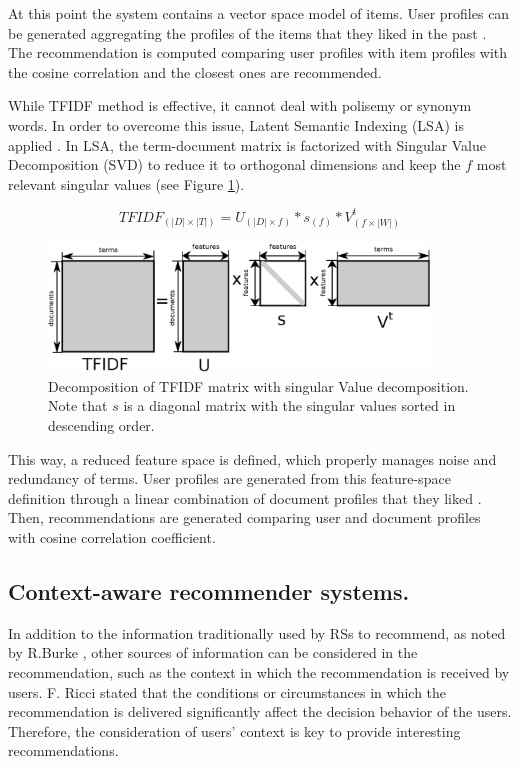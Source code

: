 \documentclass[preprint]{elsarticle}
\begin{document}
\begin{spacing}{1.5}
At this point the system contains a vector space model of items. User profiles can be generated aggregating the profiles of the items that they liked in the past \cite{Symeonidis2007}. The recommendation is computed comparing user profiles with item profiles with the cosine correlation and the closest ones are recommended. 

While TFIDF method is effective, it cannot deal with polisemy or synonym words. In order to overcome this issue, Latent Semantic Indexing (LSA) is applied \cite{deGemmis2015}. In LSA, the term-document matrix is factorized with Singular Value Decomposition (SVD) to reduce it to orthogonal dimensions and keep the $f$ most relevant singular values (see Figure \ref{fig:svd-scheme}).

\begin{equation}
	TFIDF_{(|D|\times|T|)} = U_{(|D|\times f)} * s_{(f)} * V^t_{(f \times |W|)}
	\label{eq:svd}
\end{equation}

\begin{figure}[h]
	\centering
	\includegraphics[width=0.9\textwidth]{figures/svd-scheme.eps}
	\caption{Decomposition of TFIDF matrix with singular Value decomposition. Note that $s$ is a diagonal matrix with the singular values sorted in descending order.}
	\label{fig:svd-scheme}
\end{figure}

This way, a reduced feature space is defined, which properly manages noise and redundancy of terms. User profiles are generated from this feature-space definition through a linear combination of document profiles that they liked \cite{Bambini2011}. Then, recommendations are generated comparing user and document profiles with cosine correlation coefficient.

\subsection{Context-aware recommender systems.}

In addition to the information traditionally used by RSs to recommend, as noted by R.Burke \cite{Burke2002}, other sources of information can be considered in the recommendation, such as the context in which the recommendation is received by users. F. Ricci \cite{Ricci2012contextualizing} stated that the conditions or circumstances in which the recommendation is delivered significantly affect the decision behavior of the users. Therefore, the consideration of users' context is key to provide interesting recommendations.


\end{spacing}
\end{document}
